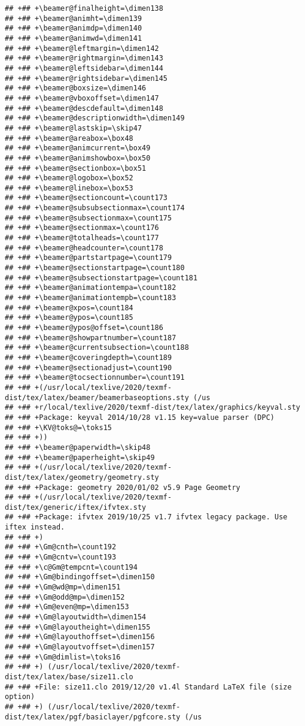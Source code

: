 \documentclass[ignorenonframetext,]{beamer}
\begin{document}
\begin{verbatim}
## +## +\beamer@finalheight=\dimen138
## +## +\beamer@animht=\dimen139
## +## +\beamer@animdp=\dimen140
## +## +\beamer@animwd=\dimen141
## +## +\beamer@leftmargin=\dimen142
## +## +\beamer@rightmargin=\dimen143
## +## +\beamer@leftsidebar=\dimen144
## +## +\beamer@rightsidebar=\dimen145
## +## +\beamer@boxsize=\dimen146
## +## +\beamer@vboxoffset=\dimen147
## +## +\beamer@descdefault=\dimen148
## +## +\beamer@descriptionwidth=\dimen149
## +## +\beamer@lastskip=\skip47
## +## +\beamer@areabox=\box48
## +## +\beamer@animcurrent=\box49
## +## +\beamer@animshowbox=\box50
## +## +\beamer@sectionbox=\box51
## +## +\beamer@logobox=\box52
## +## +\beamer@linebox=\box53
## +## +\beamer@sectioncount=\count173
## +## +\beamer@subsubsectionmax=\count174
## +## +\beamer@subsectionmax=\count175
## +## +\beamer@sectionmax=\count176
## +## +\beamer@totalheads=\count177
## +## +\beamer@headcounter=\count178
## +## +\beamer@partstartpage=\count179
## +## +\beamer@sectionstartpage=\count180
## +## +\beamer@subsectionstartpage=\count181
## +## +\beamer@animationtempa=\count182
## +## +\beamer@animationtempb=\count183
## +## +\beamer@xpos=\count184
## +## +\beamer@ypos=\count185
## +## +\beamer@ypos@offset=\count186
## +## +\beamer@showpartnumber=\count187
## +## +\beamer@currentsubsection=\count188
## +## +\beamer@coveringdepth=\count189
## +## +\beamer@sectionadjust=\count190
## +## +\beamer@tocsectionnumber=\count191
## +## +(/usr/local/texlive/2020/texmf-dist/tex/latex/beamer/beamerbaseoptions.sty (/us
## +## +r/local/texlive/2020/texmf-dist/tex/latex/graphics/keyval.sty
## +## +Package: keyval 2014/10/28 v1.15 key=value parser (DPC)
## +## +\KV@toks@=\toks15
## +## +))
## +## +\beamer@paperwidth=\skip48
## +## +\beamer@paperheight=\skip49
## +## +(/usr/local/texlive/2020/texmf-dist/tex/latex/geometry/geometry.sty
## +## +Package: geometry 2020/01/02 v5.9 Page Geometry
## +## +(/usr/local/texlive/2020/texmf-dist/tex/generic/iftex/ifvtex.sty
## +## +Package: ifvtex 2019/10/25 v1.7 ifvtex legacy package. Use iftex instead.
## +## +)
## +## +\Gm@cnth=\count192
## +## +\Gm@cntv=\count193
## +## +\c@Gm@tempcnt=\count194
## +## +\Gm@bindingoffset=\dimen150
## +## +\Gm@wd@mp=\dimen151
## +## +\Gm@odd@mp=\dimen152
## +## +\Gm@even@mp=\dimen153
## +## +\Gm@layoutwidth=\dimen154
## +## +\Gm@layoutheight=\dimen155
## +## +\Gm@layouthoffset=\dimen156
## +## +\Gm@layoutvoffset=\dimen157
## +## +\Gm@dimlist=\toks16
## +## +) (/usr/local/texlive/2020/texmf-dist/tex/latex/base/size11.clo
## +## +File: size11.clo 2019/12/20 v1.4l Standard LaTeX file (size option)
## +## +) (/usr/local/texlive/2020/texmf-dist/tex/latex/pgf/basiclayer/pgfcore.sty (/us

\end{verbatim}
\end{document}
